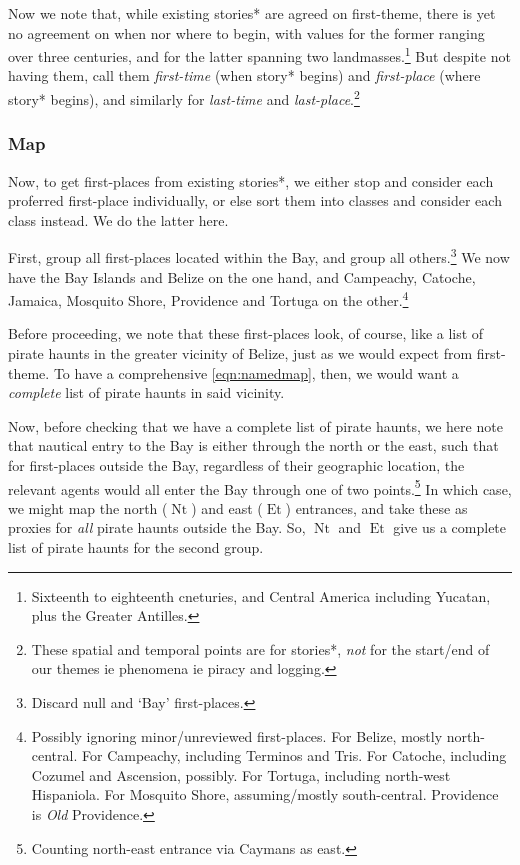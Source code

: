 \documentclass{amsart}
\newcommand{\ment}{\textit} %
\DeclareMathOperator{\et}{Et} %
\DeclareMathOperator{\nt}{Nt} %
\theoremstyle{definition}
\theoremstyle{remark}
\begin{document}
		Now we note that, while existing stories* are agreed on first-theme, there is yet no agreement on when nor where to begin, with values for the former ranging over three centuries, and for the latter spanning two landmasses.\footnote{Sixteenth to eighteenth cneturies, and Central America including Yucatan, plus the Greater Antilles.} But despite not having them, call them \ment{first-time} (when story* begins) and \ment{first-place} (where story* begins), and similarly for \ment{last-time} and \ment{last-place}.\footnote{These spatial and temporal points are for stories*, \emph{not} for the start/end of our themes ie phenomena ie piracy and logging.}
		\subsubsection{Map}
		\label{sss:map}
			Now, to get first-places from existing stories*, we either stop and consider each proferred first-place individually, or else sort them into classes and consider each class instead. We do the latter here.
		
			First, group all first-places located within the Bay, and group all others.\footnote{Discard null and `Bay' first-places.} We now have the Bay Islands and Belize on the one hand, and Campeachy, Catoche, Jamaica, Mosquito Shore, Providence and Tortuga on the other.\footnote{Possibly ignoring minor/unreviewed first-places. For Belize, mostly north-central. For Campeachy, including Terminos and Tris. For Catoche, including Cozumel and Ascension, possibly. For Tortuga, including north-west Hispaniola. For Mosquito Shore, assuming/mostly south-central. Providence is \emph{Old} Providence.}
		
			Before proceeding, we note that these first-places look, of course, like a list of pirate haunts in the greater vicinity of Belize, just as we would expect from first-theme. To have a comprehensive \ref{eqn:namedmap}, then, we would want a \emph{complete} list of pirate haunts in said vicinity.
		
			Now, before checking that we have a complete list of pirate haunts, we here note that nautical entry to the Bay is either through the north or the east, such that for first-places outside the Bay, regardless of their geographic location, the relevant agents would all enter the Bay through one of two points.\footnote{Counting north-east entrance via Caymans as east.} In which case, we might map the north (\(\nt\)) and east (\(\et\)) entrances, and take these as proxies for \emph{all} pirate haunts outside the Bay. So, \(\nt\) and \(\et\) give us a complete list of pirate haunts for the second group.
		
\end{document}
